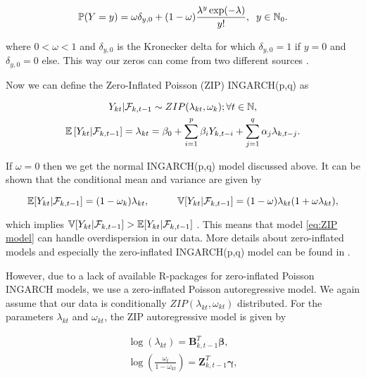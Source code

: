 \begin{equation}
\mathbb{P}(Y=y) = \omega \delta_{y,0}+ (1-\omega) \frac{\lambda^y \exp(-\lambda)}{y!}, \hspace{0.2cm} y \in \mathbb{N}_0.
\label{eq:ZIP Distribution}
\end{equation}

where $0 < \omega < 1$ and $\delta_{y,0}$ is the Kronecker delta for which $\delta_{y,0}=1$ if $y=0$ and $\delta_{y,0}=0$ else. This way our zeros can come from two different sources \cite{Zhu:2012}. 

Now we can define the Zero-Inflated Poisson (ZIP) INGARCH(p,q) as

\begin{gather}
\label{eq:ZIP model}
Y_{kt} | \mathcal{F}_{k,t-1} \sim ZIP(\lambda_{kt},\omega_k); \forall t \in \mathbb{N}, \\
\mathbb{E}\left[Y_{kt} | \mathcal{F}_{k,t-1} \right] = \lambda_{kt} = \beta_0 + \sum_{i=1}^p\beta_i Y_{k,t-i} + \sum_{j=1}^q\alpha_j \lambda_{k,t-j}.
\end{gather}

If $\omega =0$ then we get the normal INGARCH(p,q) model discussed above. It can be shown that the conditional mean and variance are given by

\begin{equation}
\mathbb{E}[Y_{kt} | \mathcal{F}_{k,t-1}] = (1-\omega_k)\lambda_{kt}, \hspace{1cm} \mathbb{V}[Y_{kt} | \mathcal{F}_{k,t-1}] =(1-\omega)\lambda_{kt}(1+\omega \lambda_{kt}),
\label{eq:Conditional Mean and Variance ZIP}
\end{equation}

which implies $ \mathbb{V}[Y_{kt} | \mathcal{F}_{k,t-1}] > \mathbb{E}[Y_{kt} | \mathcal{F}_{k,t-1}]$ \cite{Zhu:2012}. This means that model \ref{eq:ZIP model} can handle overdispersion in our data. More details about zero-inflated models and especially the zero-inflated INGARCH(p,q) model can be found in \cite{Zhu:2012}.

However, due to a lack of available R-packages for zero-inflated Poisson INGARCH models, we use a zero-inflated Poisson autoregressive model. We again assume that our data is conditionally $ZIP(\lambda_{kt},\omega_{kt})$ distributed. For the parameters $\lambda_{kt}$ and $\omega_{kt}$, the ZIP autoregressive model is given by \cite{Lambert:1992}

\begin{gather}
\log(\lambda_{kt}) = \bm{B}^T_{k,t-1} \bm{\beta},\\
\log\left(\frac{\omega_{t}}{1-\omega_{kt}}\right)=\bm{Z}_{k,t-1}^T\bm{\gamma},
\label{eq:ZIP Autoregressive model}
\end{gather}

